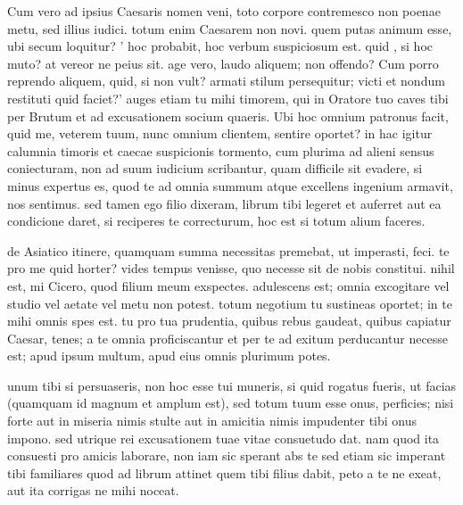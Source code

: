  Cum vero ad ipsius Caesaris nomen veni, toto corpore contremesco non poenae metu, sed illius iudici. totum enim Caesarem non novi. quem putas animum esse, ubi secum loquitur? ' hoc probabit, hoc verbum suspiciosum est. quid , si hoc muto? at vereor ne peius sit. age vero, laudo aliquem; non offendo? Cum porro reprendo aliquem, quid, si non vult? armati stilum persequitur; victi et nondum restituti quid faciet?' auges etiam tu mihi timorem, qui in Oratore tuo caves tibi per Brutum et ad excusationem socium quaeris. Ubi hoc omnium patronus facit, quid me, veterem tuum, nunc omnium clientem, sentire oportet? in hac igitur calumnia timoris et caecae suspicionis tormento, cum plurima ad alieni sensus coniecturam, non ad suum iudicium scribantur, quam difficile sit evadere, si minus expertus es, quod te ad omnia summum atque excellens ingenium armavit, nos sentimus. sed tamen ego filio dixeram, librum tibi legeret et auferret aut ea condicione daret, si reciperes te correcturum, hoc est si totum alium faceres.

 de Asiatico itinere, quamquam summa necessitas premebat, ut imperasti, feci. te pro me quid horter? vides tempus venisse, quo necesse sit de nobis constitui. nihil est, mi Cicero, quod filium meum exspectes. adulescens est; omnia excogitare vel studio vel aetate vel metu non potest. totum negotium tu sustineas oportet; in te mihi omnis spes est. tu pro tua prudentia, quibus rebus gaudeat, quibus capiatur Caesar, tenes; a te omnia proficiscantur et per te ad exitum perducantur necesse est; apud ipsum multum, apud eius omnis plurimum potes.

 unum tibi si persuaseris, non hoc esse tui muneris, si quid rogatus fueris, ut facias (quamquam id magnum et amplum est), sed totum tuum esse onus, perficies; nisi forte aut in miseria nimis stulte aut in amicitia nimis impudenter tibi onus impono. sed utrique rei excusationem tuae vitae consuetudo dat. nam quod ita consuesti pro amicis laborare, non iam sic sperant abs te sed etiam sic imperant tibi familiares quod ad librum attinet quem tibi filius dabit, peto a te ne exeat, aut ita corrigas ne mihi noceat.
